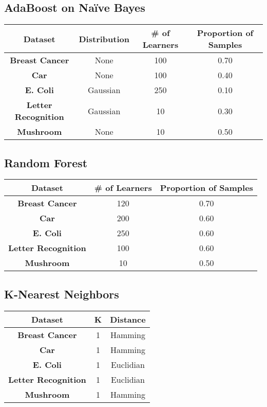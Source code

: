 \documentclass[11pt,titlepage]{article}
\newcommand{\bb}{\textbf}
\begin{document}
\subsection{AdaBoost on Naïve Bayes}
\begin{tabular}{ |c|c|c|c| } \hline
  \bb{Dataset}            & \bb{Distribution} & \bb{\# of Learners} & \bb{Proportion of Samples} \\ \hline
  \bb{Breast Cancer}      & None              & 100                 & 0.70                       \\ \hline
  \bb{Car}                & None              & 100                 & 0.40                       \\ \hline
  \bb{E. Coli}            & Gaussian          & 250                 & 0.10                       \\ \hline
  \bb{Letter Recognition} & Gaussian          & 10                  & 0.30                       \\ \hline
  \bb{Mushroom}           & None              & 10                  & 0.50                       \\ \hline
\end{tabular}

\subsection{Random Forest}
\begin{tabular}{ |c|c|c| } \hline
  \bb{Dataset}            & \bb{\# of Learners} & \bb{Proportion of Samples} \\ \hline
  \bb{Breast Cancer}      & 120                 & 0.70                       \\ \hline
  \bb{Car}                & 200                 & 0.60                       \\ \hline
  \bb{E. Coli}            & 250                 & 0.60                       \\ \hline
  \bb{Letter Recognition} & 100                 & 0.60                       \\ \hline
  \bb{Mushroom}           & 10                  & 0.50                       \\ \hline
\end{tabular}

\subsection{K-Nearest Neighbors}
\begin{tabular}{ |c|c|c| } \hline
  \bb{Dataset}            & \bb{K} & \bb{Distance} \\ \hline
  \bb{Breast Cancer}      & 1      & Hamming       \\ \hline
  \bb{Car}                & 1      & Hamming       \\ \hline
  \bb{E. Coli}            & 1      & Euclidian     \\ \hline
  \bb{Letter Recognition} & 1      & Euclidian     \\ \hline
  \bb{Mushroom}           & 1      & Hamming       \\ \hline
\end{tabular}
\end{document}
